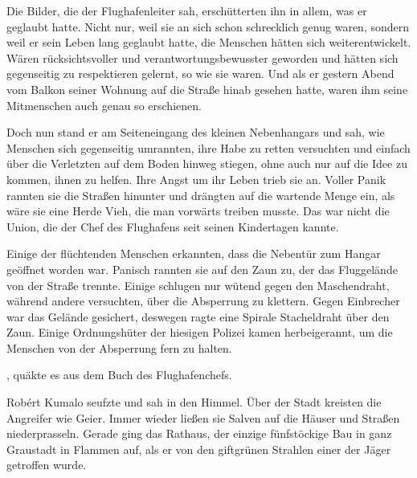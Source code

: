 Die Bilder, die der Flughafenleiter sah, erschütterten ihn in allem, was er geglaubt hatte. Nicht nur, weil sie an sich schon schrecklich genug waren, sondern weil er sein Leben lang geglaubt hatte, die Menschen hätten sich weiterentwickelt. Wären rücksichtsvoller und verantwortungsbewusster geworden und hätten sich gegenseitig zu respektieren gelernt, so wie sie waren. Und als er gestern Abend vom Balkon seiner Wohnung auf die Straße hinab gesehen hatte, waren ihm seine Mitmenschen auch genau so erschienen.

\par

Doch nun stand er am Seiteneingang des kleinen Nebenhangars und sah, wie Menschen sich gegenseitig umrannten, ihre Habe zu retten versuchten und einfach über die Verletzten auf dem Boden hinweg stiegen, ohne auch nur auf die Idee zu kommen, ihnen zu helfen. Ihre Angst um ihr Leben trieb sie an. Voller Panik rannten sie die Straßen hinunter und drängten auf die wartende Menge ein, als wäre sie eine Herde Vieh, die man vorwärts treiben musste. Das war nicht die Union, die der Chef des Flughafens seit seinen Kindertagen kannte.

\par

Einige der flüchtenden Menschen erkannten, dass die Nebentür zum Hangar geöffnet worden war. Panisch rannten sie auf den Zaun zu, der das Fluggelände von der Straße trennte. Einige schlugen nur wütend gegen den Maschendraht, während andere versuchten, über die Absperrung zu klettern. Gegen Einbrecher war das Gelände gesichert, deswegen ragte eine Spirale Stacheldraht über den Zaun. Einige Ordnungshüter der hiesigen Polizei kamen herbeigerannt, um die Menschen von der Absperrung fern zu halten.

\par

, quäkte es aus dem Buch des Flughafenchefs. 

\par

Robért Kumalo seufzte und sah in den Himmel. Über der Stadt kreisten die Angreifer wie Geier. Immer wieder ließen sie Salven auf die Häuser und Straßen niederprasseln. Gerade ging das Rathaus, der einzige fünfstöckige Bau in ganz Graustadt in Flammen auf, als er von den giftgrünen Strahlen einer der Jäger getroffen wurde.

\par

